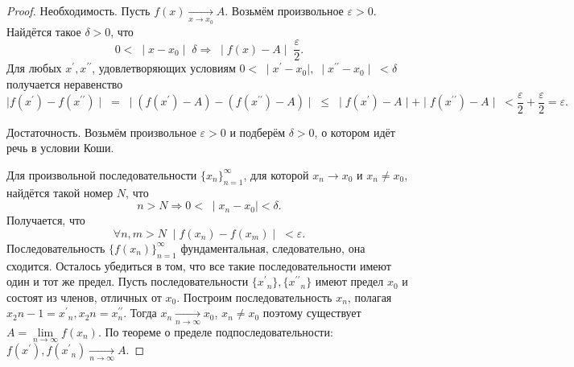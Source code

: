 \begin{proof}
Необходимость. Пусть $f(x) \xrightarrow[x \rightarrow x_0]{} A$.
Возьмём произвольное $\varepsilon > 0$. Найдётся такое $\delta > 0$, что
$$0 < \; \mid x - x_0 \mid \; \delta \Rightarrow \; \mid f(x) - A \mid \; \frac{\varepsilon}{2}.$$
Для любых $x^\prime, x^{\prime\prime}$, удовлетворяющих условиям $0 < \; \mid x^\prime - x_0 \mid, \; \mid x^{\prime\prime} - x_0 \mid \; < \delta$ получается неравенство
$$\mid f(x^\prime) - f(x^{\prime\prime}) \mid \; = \; \mid \left(f(x^\prime) - A\right) - \left(f(x^{\prime\prime}) - A\right) \mid \; \leq \; \mid f(x^\prime) - A \mid + \mid f(x^{\prime\prime}) - A \mid \; < \frac{\varepsilon}{2} + \frac{\varepsilon}{2} = \varepsilon.$$

Достаточность. Возьмём произвольное $\varepsilon > 0$ и подберём $\delta > 0$, о котором идёт речь в условии Коши.

Для произвольной последовательности $\{x_n\}^{\infty}_{n=1}$, для которой $x_n \rightarrow x_0$ и $x_n \neq x_0$, найдётся такой номер $N$, что
$$n > N \Rightarrow 0 < \; \mid x_n - x_0 \mid < \delta.$$
Получается, что
$$\forall n, m > N \; \mid f(x_n) - f(x_m) \mid \; < \varepsilon.$$
Последовательность $\{f(x_n)\}_{n=1}^{\infty}$ фундаментальная, следовательно, она сходится. Осталось убедиться в том, что все такие последовательности имеют один и тот же предел. Пусть последовательности $\{{x^\prime}_n\}, \{{x^{\prime\prime}}_n\}$ имеют предел $x_0$ и состоят из членов, отличных от $x_0$. Построим последовательность ${x_n}$, полагая $x_2n-1 = {x^\prime}_n, x_2n = x^{\prime\prime}_n$. Тогда $x_n \xrightarrow[n \rightarrow \infty]{} x_0$, $x_n \neq x_0$ поэтому существует $A=\lim\limits_{n\rightarrow \infty} f(x_n)$.
По теореме о пределе подпоследовательности: $f(x^\prime), f({x^\prime}_n) \xrightarrow[n \rightarrow \infty]{} A$.
\end{proof}

